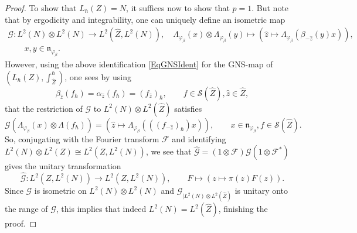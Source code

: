 \documentclass[11pt, reqno]{amsart}
\theoremstyle{definition}
\numberwithin{equation}{section}
\def\Gc{\mathcal G}
\def\Sc{\mathcal S}
\newcommand{\msF}{\mathscr{F}}
\newcommand{\mfn}{\mathfrak{n}}
\begin{document}
\begin{proof}
To show that $L_{\hbar}(Z) = N$, it suffices now to show that $p = 1$. But note that by ergodicity and integrability, one can uniquely define an isometric map 
\begin{multline}\label{EqGaloisMap}
\Gc\colon  L^2(N) \otimes L^2(N) \rightarrow L^2(\hat{Z},L^2(N)),\quad \Lambda_{\varphi_{\beta}}(x) \otimes \Lambda_{\varphi_{\beta}}(y) \mapsto \left(\hat{z} \mapsto \Lambda_{\varphi_{\beta}}(\beta_{-\hat{z}}(y)x)\right),\\ \qquad x,y \in \mfn_{\varphi_{\beta}}.
\end{multline}
However, using the above identification \eqref{EqGNSIdent} for the GNS-map of $(L_{\hbar}(Z),\int_{\hat{Z}}^{\hbar})$, one sees by using 
\[
\beta_{\hat{z}}(f_{\hbar}) = \alpha_{\hat{z}}(f_{\hbar}) = (f_{\hat{z}})_{\hbar},\qquad f\in \Sc(\hat{Z}),\hat{z}\in \hat{Z},
\] 
that the restriction of $\Gc$ to $L^2(N) \otimes L^2(\hat{Z})$ satisfies
\[
\Gc(\Lambda_{\varphi_{\beta}}(x) \otimes \Lambda(f_\hbar))=  \left(\hat{z}\mapsto \Lambda_{\varphi_{\beta}}(((f_{-\hat{z}})_{\hbar})x)\right),\qquad x\in \mfn_{\varphi_{\beta}},f\in \Sc(\hat{Z}).
\]
So, conjugating with the Fourier transform $ \msF $ and identifying $L^2(N) \otimes L^2(Z) \cong L^2(Z,L^2(N))$, we see that $\hat{\Gc} = (1\otimes \msF)\Gc(1\otimes \msF^*)$ gives the unitary transformation 
\[
\hat{\Gc}\colon  L^2(Z,L^2(N)) \rightarrow L^2(Z,L^2(N)),\qquad F \mapsto \left(z \mapsto \pi(z)F(z)\right).
\]
Since  $\Gc$ is isometric on $L^2(N) \otimes L^2(N)$ and $\Gc_{\mid L^2(N)\otimes L^2(\hat{Z})}$ is unitary onto the range of $\Gc$,  this implies that indeed $L^2(N) = L^2(\hat{Z})$, finishing the proof.
\end{proof}
\end{document}
